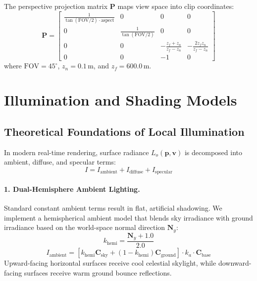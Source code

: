 \documentclass[11pt,a4paper]{article}
\begin{document}
The perspective projection matrix $\mathbf{P}$ maps view space into clip coordinates:
\begin{equation}
  \mathbf{P} = \begin{bmatrix}
    \frac{1}{\tan(\text{FOV}/2) \cdot \text{aspect}} & 0 & 0 & 0 \\
    0 & \frac{1}{\tan(\text{FOV}/2)} & 0 & 0 \\
    0 & 0 & -\frac{z_f + z_n}{z_f - z_n} & -\frac{2 z_f z_n}{z_f - z_n} \\
    0 & 0 & -1 & 0
  \end{bmatrix}
\end{equation}
where $\text{FOV} = 45^\circ$, $z_n = 0.1\,\text{m}$, and $z_f = 600.0\,\text{m}$.

\section{Illumination and Shading Models}

\subsection{Theoretical Foundations of Local Illumination}
In modern real-time rendering, surface radiance $L_o(\mathbf{p}, \mathbf{v})$ is decomposed into ambient, diffuse, and specular terms:
\begin{equation}
  I = I_{\text{ambient}} + I_{\text{diffuse}} + I_{\text{specular}}
\end{equation}

\paragraph{1. Dual-Hemisphere Ambient Lighting.}
Standard constant ambient terms result in flat, artificial shadowing. We implement a hemispherical ambient model that blends sky irradiance with ground irradiance based on the world-space normal direction $\mathbf{N}_y$:
\begin{equation}
  k_{\text{hemi}} = \frac{\mathbf{N}_y + 1.0}{2.0}
\end{equation}
\begin{equation}
  I_{\text{ambient}} = \left[ k_{\text{hemi}} \mathbf{C}_{\text{sky}} + (1 - k_{\text{hemi}}) \mathbf{C}_{\text{ground}} \right] \cdot k_a \cdot \mathbf{C}_{\text{base}}
\end{equation}
Upward-facing horizontal surfaces receive cool celestial skylight, while downward-facing surfaces receive warm ground bounce reflections.
\end{document}
